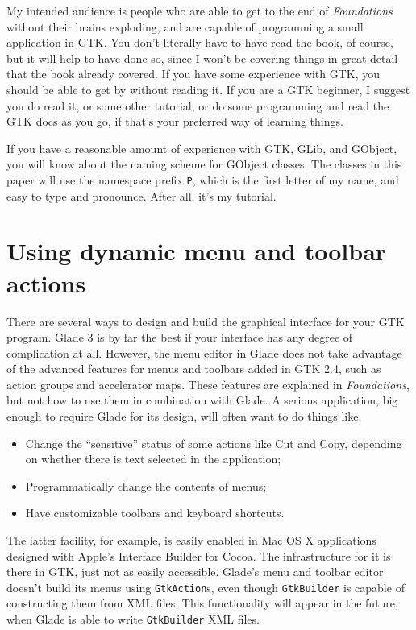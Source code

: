 \documentclass[%
			   halfparskip,smallheadings,pointlessnumbers]%
			   {scrartcl} %
\begin{document}
My intended audience is people who are able to get to the end of \emph{Foundations} without their brains exploding, and are capable of programming a small application in GTK. You don't literally have to have read the book, of course, but it will help to have done so, since I won't be covering things in great detail that the book already covered. If you have some experience with GTK, you should be able to get by without reading it. If you are a GTK beginner, I suggest you do read it, or some other tutorial, or do some programming and read the GTK docs as you go, if that's your preferred way of learning things.

If you have a reasonable amount of experience with GTK, GLib, and GObject, you will know about the naming scheme for GObject classes. The classes in this paper will use the namespace prefix \lstinline$P$, which is the first letter of my name, and easy to type and pronounce. After all, it's my tutorial.

\section{Using dynamic menu and toolbar actions}

There are several ways to design and build the graphical interface for your GTK program. Glade 3 is by far the best if your interface has any degree of complication at all. However, the menu editor in Glade does not take advantage of the advanced features for menus and toolbars added in GTK 2.4, such as action groups and accelerator maps. These features are explained in \emph{Foundations}, but not how to use them in combination with Glade. A serious application, big enough to require Glade for its design, will often want to do things like:
\begin{itemize}
\item Change the ``sensitive'' status of some actions like Cut and Copy, depending on whether there is text selected in the application;
\item Programmatically change the contents of menus;
\item Have customizable toolbars and keyboard shortcuts.
\end{itemize}
The latter facility, for example, is easily enabled in Mac OS X applications designed with Apple's Interface Builder for Cocoa. The infrastructure for it is there in GTK, just not as easily accessible. Glade's menu and toolbar editor doesn't build its menus using \lstinline$GtkAction$s, even though \lstinline$GtkBuilder$ is capable of constructing them from XML files. This functionality will appear in the future, when Glade is able to write \lstinline$GtkBuilder$ XML files.
\end{document}
